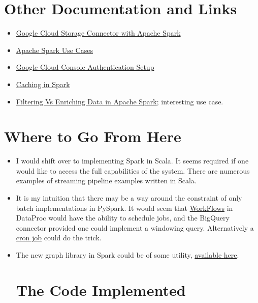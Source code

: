 \documentclass[english]{article}
\begin{document}
\section{Other Documentation and Links}
\begin{itemize}
\item \href{https://cloud.google.com/dataproc/docs/tutorials/gcs-connector-spark-tutorial}{Google Cloud Storage Connector with Apache Spark}
\item \href{https://www.qubole.com/blog/apache-spark-use-cases/}{Apache Spark Use Cases}
\item \href{https://cloud.google.com/docs/authentication/getting-started}{Google Cloud Console Authentication Setup}
\item \href{https://jaceklaskowski.gitbooks.io/mastering-apache-spark/spark-rdd-caching.html}{Caching in Spark}
\item \href{https://medium.com/capital-one-tech/filtering-vs-enriching-data-in-apache-spark-e44108c3a372}{Filtering Vs Enriching Data in Apache Spark}; interesting use case.
\end{itemize}
\section{Where to Go From Here}
\begin{itemize}
\item I would shift over to implementing Spark in Scala. It seems required if one would like to access the full capabilities of the system. There are numerous examples of streaming pipeline examples written in Scala.
\item It is my intuition that there may be a way around the constraint of only batch implementations in PySpark. It would seem that \href{https://cloud.google.com/dataproc/docs/concepts/workflows/overview}{WorkFlows} in DataProc would have the ability to schedule jobs, and the BigQuery connector provided one could implement a windowing query. Alternatively a \href{https://stackoverflow.com/questions/30375571/running-scheduled-spark-job}{cron job} could do the trick.
\item The new graph library in Spark could be of some utility, \href{https://spark.apache.org/docs/latest/graphx-programming-guide.html}{available here}.
\section{The Code Implemented}
\end{itemize}
\end{document}
